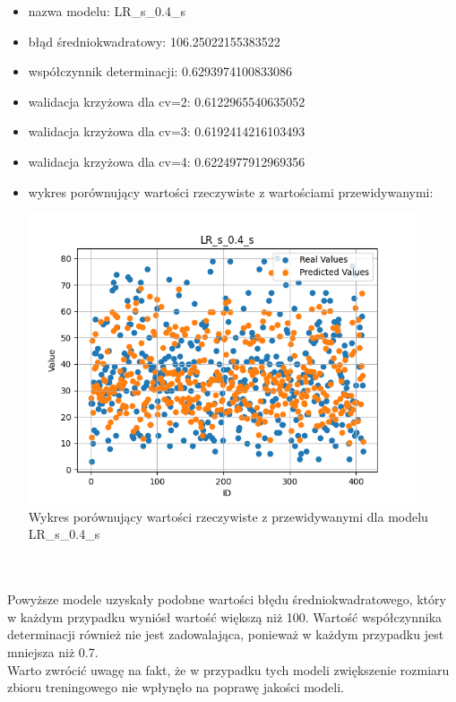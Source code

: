 \documentclass[11pt, a4paper, notitlepage]{report}
\begin{document}
\begin{itemize}
	\item nazwa modelu: LR\_s\_0.4\_s
	\item błąd średniokwadratowy: 106.25022155383522
	\item współczynnik determinacji: 0.6293974100833086
	\item walidacja krzyżowa dla cv=2: 0.6122965540635052
	\item walidacja krzyżowa dla cv=3: 0.6192414216103493
	\item walidacja krzyżowa dla cv=4: 0.6224977912969356
	\item wykres porównujący wartości rzeczywiste z wartościami przewidywanymi: \begin{center} \small
		\includegraphics[width=0.9\textwidth]{graphics/plots/LR_s_0.4_s.png} \\
		\caption{Wykres porównujący wartości rzeczywiste z przewidywanymi dla modelu LR\_s\_0.4\_s}
	\end{center}
	\end{itemize}
\\ \\
Powyższe modele uzyskały podobne wartości błędu średniokwadratowego, który w każdym przypadku wyniósł wartość większą niż 100.
Wartość współczynnika determinacji również nie jest zadowalająca, ponieważ w każdym przypadku jest mniejsza niż 0.7. \\
Warto zwrócić uwagę na fakt, że w przypadku tych modeli zwiększenie rozmiaru zbioru treningowego nie wpłynęło na poprawę jakości modeli.
\end{document}
